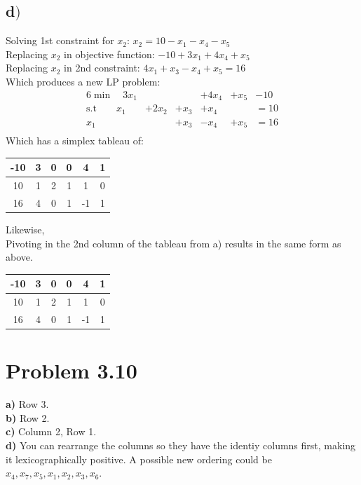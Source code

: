 \documentclass[a4paper,12pt]{article}
\begin{document}
  \subsection*{d\()\)}
    Solving 1st constraint for \(x_2\): \(x_2 = 10 - x_1 - x_4 - x_5\) \\
    Replacing \(x_2\) in objective function: \(-10 + 3x_1 + 4x_4 + x_5\) \\
    Replacing \(x_2\) in 2nd constraint: \(4x_1 + x_3 - x_4 + x_5 = 16\) \\
    Which produces a new LP problem:
    \begin{alignat*}{6}
      \min \quad 3x_1& {}& {}& + 4x_4& + x_5& - 10 \\
      \text{s.t} \quad \quad x_1& + 2x_2& + x_3& + x_4& {}& = 10\\
      x_1& {}& + x_3& - x_4& + x_5& = 16 \\
    \end{alignat*}
    Which has a simplex tableau of:
    \begin{center}
      \begin{tabular}{| c | c c c c c |}
	\hline
	-10 & 3 & 0 & 0 & 4 & 1 \\
	\hline
	10 & 1 & 2 & 1 & 1 & 0 \\
	16 & 4 & 0 & 1 & -1 & 1 \\
	\hline
      \end{tabular}
    \end{center}
    Likewise, \\
    Pivoting in the 2nd column of the tableau from a) results in the same form as above. \\
    \begin{center}
      \begin{tabular}{| c | c c c c c |}
	\hline
	-10 & 3 & 0 & 0 & 4 & 1 \\
	\hline
	10 & 1 & 2 & 1 & 1 & 0 \\
	16 & 4 & 0 & 1 & -1 & 1 \\
	\hline
      \end{tabular}
    \end{center}

\section*{Problem 3.10}
{\bf a)} Row 3. \\
{\bf b)} Row 2. \\
{\bf c)} Column 2, Row 1. \\
{\bf d)} You can rearrange the columns so they have the identiy columns first, making it lexicographically positive. A possible new
ordering could be \(x_4, x_7, x_5, x_1, x_2, x_3, x_6 \).
\end{document}
